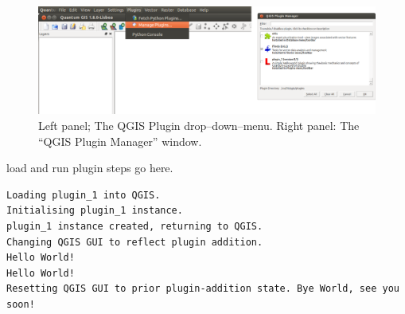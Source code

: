 \begin{figure}
 \centering
 \includegraphics[width=\textwidth]{figures/loading_QGIS_plugins.png}
 \caption{Left panel; The QGIS Plugin drop--down--menu. Right panel: The ``QGIS Plugin Manager'' window.}
 \label{fig:loading_QGIS_plugins}
\end{figure}
load and run plugin steps go here.

\begin{lstlisting}
Loading plugin_1 into QGIS.
Initialising plugin_1 instance.
plugin_1 instance created, returning to QGIS.
Changing QGIS GUI to reflect plugin addition.
Hello World!
Hello World!
Resetting QGIS GUI to prior plugin-addition state. Bye World, see you soon!
\end{lstlisting}


